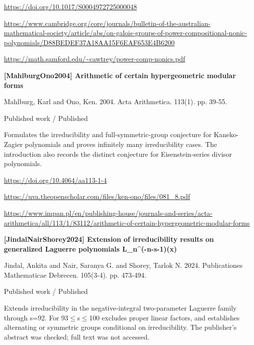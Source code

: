 \documentclass[11pt,a4paper,oneside,openany]{book}
\begin{document}
{\footnotesize\url{https://doi.org/10.1017/S0004972725000048}}\par
{\footnotesize\url{https://www.cambridge.org/core/journals/bulletin-of-the-australian-mathematical-society/article/abs/on-galois-groups-of-power-compositional-nonic-polynomials/D88BEDEF37A18AA15F6EAF653E4B6200}}\par
{\footnotesize\url{https://math.samford.edu/~cawtrey/power-comp-nonics.pdf}}\par
\vspace{9pt}
\hypertarget{ref:MahlburgOno2004}{}
{\sffamily\bfseries\color{atlasgreen}[MahlburgOno2004] Arithmetic of certain hypergeometric modular forms}\par
\color{black} Mahlburg, Karl and Ono, Ken. 2004. Acta Arithmetica. 113(1). pp. 39-55.\par
{\small\sffamily\color{atlasgold}Published work / Published}\par
\color{black} Formulates the irreducibility and full-symmetric-group conjecture for Kaneko-Zagier polynomials and proves infinitely many irreducibility cases. The introduction also records the distinct conjecture for Eisenstein-series divisor polynomials.\par
{\footnotesize\url{https://doi.org/10.4064/aa113-1-4}}\par
{\footnotesize\url{https://uva.theopenscholar.com/files/ken-ono/files/081_8.pdf}}\par
{\footnotesize\url{https://www.impan.pl/en/publishing-house/journals-and-series/acta-arithmetica/all/113/1/83112/arithmetic-of-certain-hypergeometric-modular-forms}}\par
\vspace{9pt}
\hypertarget{ref:JindalNairShorey2024}{}
{\sffamily\bfseries\color{atlasgreen}[JindalNairShorey2024] Extension of irreducibility results on generalized Laguerre polynomials L\_\allowbreak{}n\textasciicircum{}(-n-s-1)(x)}\par
\color{black} Jindal, Ankita and Nair, Saranya G. and Shorey, Tarlok N. 2024. Publicationes Mathematicae Debrecen. 105(3-4). pp. 473-494.\par
{\small\sffamily\color{atlasgold}Published work / Published}\par
\color{black} Extends irreducibility in the negative-integral two-parameter Laguerre family through s=92. For 93\ensuremath{\le}s\ensuremath{\le}100 excludes proper linear factors, and establishes alternating or symmetric groups conditional on irreducibility. The publisher's abstract was checked; full text was not accessed.\par
\end{document}
